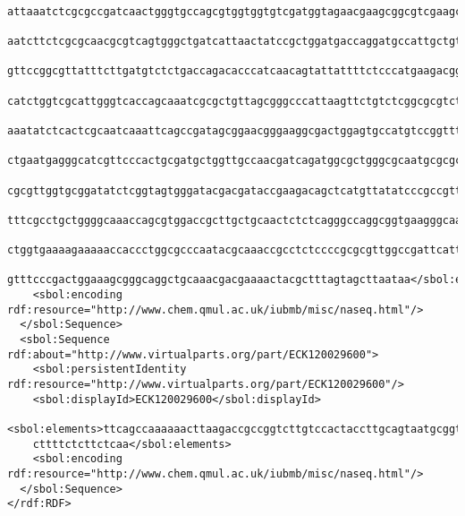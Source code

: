 \begin{lstlisting}
    attaaatctcgcgccgatcaactgggtgccagcgtggtggtgtcgatggtagaacgaagcggcgtcgaagcctgtaaagcggcggtgcac
    aatcttctcgcgcaacgcgtcagtgggctgatcattaactatccgctggatgaccaggatgccattgctgtggaagctgcctgcactaat
    gttccggcgttatttcttgatgtctctgaccagacacccatcaacagtattattttctcccatgaagacggtacgcgactgggcgtggag
    catctggtcgcattgggtcaccagcaaatcgcgctgttagcgggcccattaagttctgtctcggcgcgtctgcgtctggctggctggcat
    aaatatctcactcgcaatcaaattcagccgatagcggaacgggaaggcgactggagtgccatgtccggttttcaacaaaccatgcaaatg
    ctgaatgagggcatcgttcccactgcgatgctggttgccaacgatcagatggcgctgggcgcaatgcgcgccattaccgagtccgggctg
    cgcgttggtgcggatatctcggtagtgggatacgacgataccgaagacagctcatgttatatcccgccgttaaccaccatcaaacaggat
    tttcgcctgctggggcaaaccagcgtggaccgcttgctgcaactctctcagggccaggcggtgaagggcaatcagctgttgcccgtctca
    ctggtgaaaagaaaaaccaccctggcgcccaatacgcaaaccgcctctccccgcgcgttggccgattcattaatgcagctggcacgacag
    gtttcccgactggaaagcgggcaggctgcaaacgacgaaaactacgctttagtagcttaataa</sbol:elements>
    <sbol:encoding rdf:resource="http://www.chem.qmul.ac.uk/iubmb/misc/naseq.html"/>
  </sbol:Sequence>
  <sbol:Sequence rdf:about="http://www.virtualparts.org/part/ECK120029600">
    <sbol:persistentIdentity rdf:resource="http://www.virtualparts.org/part/ECK120029600"/>
    <sbol:displayId>ECK120029600</sbol:displayId>
    <sbol:elements>ttcagccaaaaaacttaagaccgccggtcttgtccactaccttgcagtaatgcggtggacaggatcggcggtttt
    cttttctcttctcaa</sbol:elements>
    <sbol:encoding rdf:resource="http://www.chem.qmul.ac.uk/iubmb/misc/naseq.html"/>
  </sbol:Sequence>
</rdf:RDF>

\end{lstlisting}